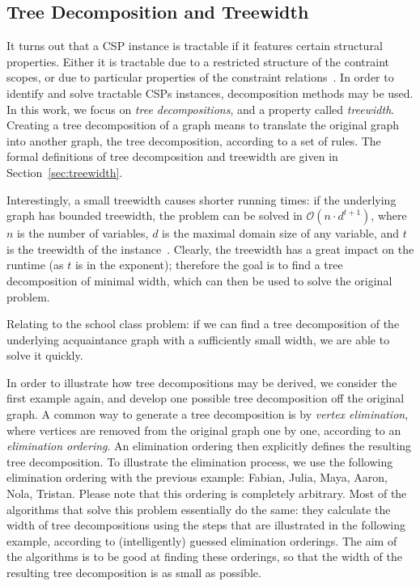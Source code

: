 \documentclass[thesis.tex]{subfiles}
\begin{document}
\subsection*{Tree Decomposition and Treewidth}
It turns out that a \gls{CSP} instance is tractable if it features certain structural properties. Either it is tractable due to a restricted structure of the contraint scopes, or due to particular properties of the constraint relations~\parencite{Gottlob2000243,pearson1997survey}. In order to identify and solve tractable \glspl{CSP} instances, decomposition methods may be used. In this work, we focus on \emph{tree decompositions}, and a property called \emph{treewidth}. Creating a tree decomposition of a graph means to translate the original graph into another graph, the tree decomposition, according to a set of rules. The formal definitions of tree decomposition and treewidth are given in Section~\vref{sec:treewidth}.

Interestingly, a small treewidth causes shorter running times: if the underlying graph has bounded treewidth, the problem can be solved in $\mathcal{O}(n \cdot d^{t+1})$, where $n$ is the number of variables, $d$ is the maximal domain size of any variable, and $t$ is the treewidth of the instance~\parencite{Russell:2003:AIM:773294}. Clearly, the treewidth has a great impact on the runtime (as $t$ is in the exponent); therefore the goal is to find a tree decomposition of minimal width, which can then be used to solve the original problem.

Relating to the school class problem: if we can find a tree decomposition of the underlying acquaintance graph with a sufficiently small width, we are able to solve it quickly.

In order to illustrate how tree decompositions may be derived, we consider the first example again, and develop one possible tree decomposition off the original graph. A common way to generate a tree decomposition is by \emph{vertex elimination}, where vertices are removed from the original graph one by one, according to an \emph{elimination ordering}. An elimination ordering then explicitly defines the resulting tree decomposition. To illustrate the elimination process, we use the following elimination ordering with the previous example: Fabian, Julia, Maya, Aaron, Nola, Tristan. Please note that this ordering is completely arbitrary. Most of the algorithms that solve this problem essentially do the same: they calculate the width of tree decompositions using the steps that are illustrated in the following example, according to (intelligently) guessed elimination orderings. The aim of the algorithms is to be good at finding these orderings, so that the width of the resulting tree decomposition is as small as possible.
\end{document}

